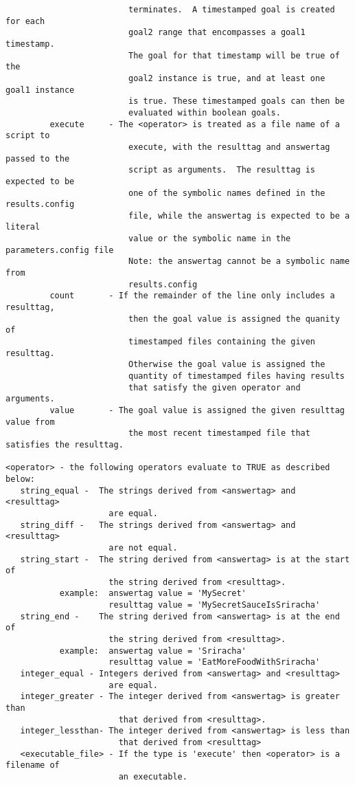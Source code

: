 \documentclass[12pt]{article}
\begin{document}
\begin{verbatim}
                         terminates.  A timestamped goal is created for each
                         goal2 range that encompasses a goal1 timestamp.
                         The goal for that timestamp will be true of the
                         goal2 instance is true, and at least one goal1 instance
                         is true. These timestamped goals can then be
                         evaluated within boolean goals.
         execute     - The <operator> is treated as a file name of a script to 
                         execute, with the resulttag and answertag passed to the 
                         script as arguments.  The resulttag is expected to be 
                         one of the symbolic names defined in the results.config 
                         file, while the answertag is expected to be a literal 
                         value or the symbolic name in the parameters.config file 
                         Note: the answertag cannot be a symbolic name from 
                         results.config 
         count       - If the remainder of the line only includes a resulttag,
                         then the goal value is assigned the quanity of 
                         timestamped files containing the given resulttag.  
                         Otherwise the goal value is assigned the
                         quantity of timestamped files having results
                         that satisfy the given operator and arguments.
         value       - The goal value is assigned the given resulttag value from
                         the most recent timestamped file that satisfies the resulttag.
 
<operator> - the following operators evaluate to TRUE as described below:
   string_equal -  The strings derived from <answertag> and <resulttag>
                     are equal.
   string_diff -   The strings derived from <answertag> and <resulttag>
                     are not equal.
   string_start -  The string derived from <answertag> is at the start of 
                     the string derived from <resulttag>.
           example:  answertag value = 'MySecret'
                     resulttag value = 'MySecretSauceIsSriracha'
   string_end -    The string derived from <answertag> is at the end of
                     the string derived from <resulttag>.
           example:  answertag value = 'Sriracha'
                     resulttag value = 'EatMoreFoodWithSriracha'
   integer_equal - Integers derived from <answertag> and <resulttag>
                     are equal.
   integer_greater - The integer derived from <answertag> is greater than
                       that derived from <resulttag>.
   integer_lessthan- The integer derived from <answertag> is less than
                       that derived from <resulttag>
   <executable_file> - If the type is 'execute' then <operator> is a filename of 
                       an executable.
             

\end{verbatim}
\end{document}
